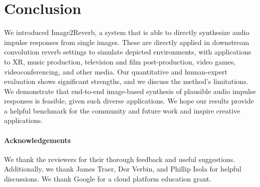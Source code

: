 \documentclass[10pt,twocolumn,letterpaper]{article}
\begin{document}
\section{Conclusion}
We introduced Image2Reverb, a system that is able to directly synthesize audio impulse responses from single images. These are directly applied in downstream convolution reverb settings to simulate depicted environments, with applications to XR, music production, television and film post-production, video games, videoconferencing, and other media. Our quantitative and human-expert evaluation shows significant strengths, and we discuss the method's limitations. We demonstrate that end-to-end image-based synthesis of plausible audio impulse responses is feasible, given such diverse applications. We hope our results provide a helpful benchmark for the community and future work and inspire creative applications.

{\small
\paragraph{Acknowledgements}
We thank the reviewers for their thorough feedback and useful suggestions. Additionally, we thank James Traer, Dor Verbin, and Phillip Isola for helpful discussions. We thank Google for a cloud platform education grant.
}

{\small


}

\appendix

\end{document}
